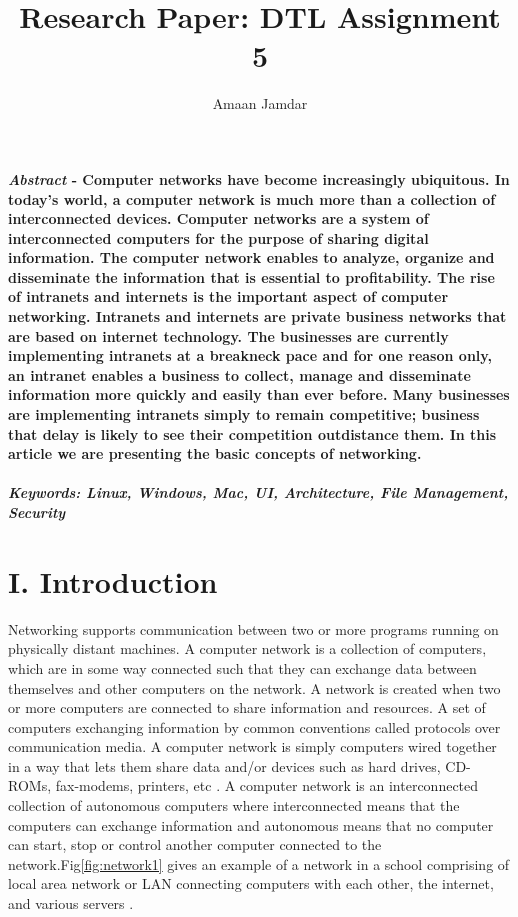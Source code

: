 \documentclass[12pt]{article}
\title{\textbf {Research Paper: DTL Assignment 5}}
\author{Amaan Jamdar}
\begin{document}
\maketitle
\clearpage

\begin{multicols*}{2}


\textbf{{\it  Abstract} - Computer
networks have become increasingly ubiquitous. In today's world, a computer network is much more than a collection of
interconnected devices. Computer networks are a
system of interconnected computers for the purpose of
sharing digital information. The computer network
enables to analyze, organize and disseminate the
information that is essential to profitability. The rise of
intranets and internets is the important aspect of
computer networking. Intranets and internets are private
business networks that are based on internet
technology. The businesses are currently implementing
intranets at a breakneck pace and for one reason only,
an intranet enables a business to collect, manage and
disseminate information more quickly and easily than
ever before. Many businesses are implementing
intranets simply to remain competitive; business that
delay is likely to see their competition outdistance
them. In this article we are presenting the basic
concepts of networking.\\ \\
\textit{Keywords: Linux, Windows, Mac, UI, Architecture, File
Management, Security}} \\


\section*{I. Introduction}
\indent \indent Networking supports communication between
two or more programs running on physically distant
machines. A computer network is a collection of
computers, which are in some way connected such that
they can exchange data between themselves and other
computers on the network. A network is created when
two or more computers are connected to share
information and resources. A set of computers
exchanging information by common conventions called
protocols over communication media. A computer
network is simply computers wired together in a way
that lets them share data and/or devices such as hard
drives, CD-ROMs, fax-modems, printers, etc \cite{2}. A
computer network is an interconnected collection of
autonomous computers where interconnected means
that the computers can exchange information and
autonomous means that no computer can start, stop or
control another computer connected to the network.Fig\ref{fig:network1} gives an example of a network in a school comprising
of local area network or LAN connecting computers with each other, the internet, and various servers \cite{4}.\\


\end{multicols*}
\end{document}
